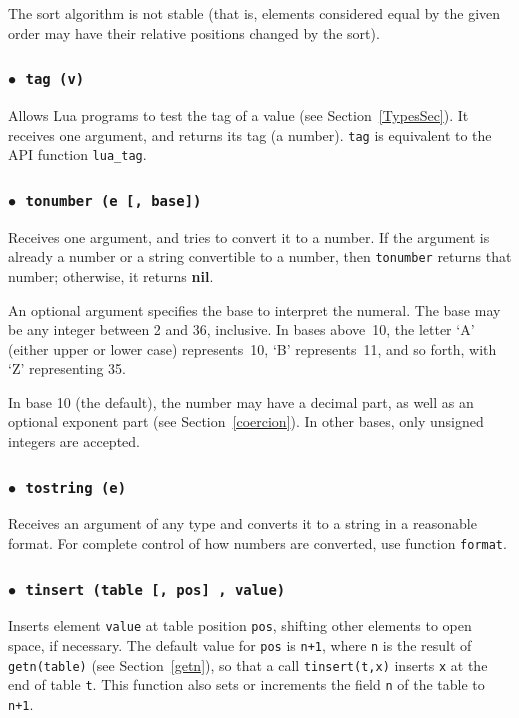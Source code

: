 \documentclass[11pt]{article}
\newcommand{\See}[1]{Section~\ref{#1}}
\newcommand{\see}[1]{(see \See{#1})}
\newcommand{\T}[1]{{\tt #1}}
\newcommand{\nil}{{\bf nil}}
\newcommand{\Deffunc}[1]{\index{#1}}
\newcommand{\ff}{$\bullet$\ }
\begin{document}
The sort algorithm is not stable
(that is, elements considered equal by the given order
may have their relative positions changed by the sort).

\subsubsection*{\ff \T{tag (v)}}\Deffunc{tag}\label{pdf-tag}
Allows Lua programs to test the tag of a value \see{TypesSec}.
It receives one argument, and returns its tag (a number).
\verb|tag| is equivalent to the API function \verb|lua_tag|.

\subsubsection*{\ff \T{tonumber (e [, base])}}\Deffunc{tonumber}
Receives one argument,
and tries to convert it to a number.
If the argument is already a number or a string convertible
to a number, then \verb|tonumber| returns that number;
otherwise, it returns \nil.

An optional argument specifies the base to interpret the numeral.
The base may be any integer between 2 and 36, inclusive.
In bases above~10, the letter `A' (either upper or lower case)
represents~10, `B' represents~11, and so forth, with `Z' representing 35.

In base 10 (the default), the number may have a decimal part,
as well as an optional exponent part \see{coercion}.
In other bases, only unsigned integers are accepted.

\subsubsection*{\ff \T{tostring (e)}}\Deffunc{tostring}
Receives an argument of any type and
converts it to a string in a reasonable format.
For complete control of how numbers are converted,
use function \verb|format|.



\subsubsection*{\ff \T{tinsert (table [, pos] , value)}}\Deffunc{tinsert}

Inserts element \verb|value| at table position \verb|pos|,
shifting other elements to open space, if necessary.
The default value for \verb|pos| is \verb|n+1|,
where \verb|n| is the result of \verb|getn(table)| \see{getn},
so that a call \verb|tinsert(t,x)| inserts \verb|x| at the end
of table \verb|t|.
This function also sets or increments the field \verb|n| of the table
to \verb|n+1|.
\end{document}
